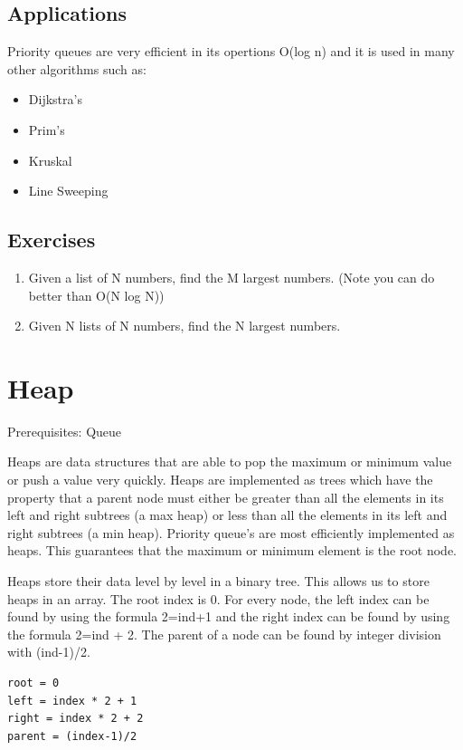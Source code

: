 \documentclass[11pt,oneside]{book}
\begin{document}
\subsection{Applications}

Priority queues are very efficient in its opertions O(log n) and it is used in many other algorithms such as:

\begin{itemize}
\item Dijkstra's
\item Prim's
\item Kruskal
\item Line Sweeping
\end{itemize}

\subsection{Exercises}

\begin{enumerate}
\item Given a list of N numbers, find the M largest numbers. (Note you can do better than O(N log N))
\item Given N lists of N numbers, find the N largest numbers.
\end{enumerate}

        \section{ Heap }
        

Prerequisites: Queue



Heaps are data structures that are able to pop the maximum or minimum value or push a value very quickly. Heaps are implemented as trees which have the property that a parent node must either be greater than all the elements in its left and right subtrees (a max heap) or less than all the elements in its left and right subtrees (a min heap). Priority queue's are most efficiently implemented as heaps. This guarantees that the maximum or minimum element is the root node.

Heaps store their data level by level in a binary tree. This allows us to store heaps in an array. The root index is 0. For every node, the left index can be found by using the formula 2=ind+1 and the right index can be found by using the formula 2=ind + 2. The parent of a node can be found by integer division with (ind-1)/2.

\begin{lstlisting}
root = 0
left = index * 2 + 1
right = index * 2 + 2
parent = (index-1)/2
\end{lstlisting}
\end{document}
